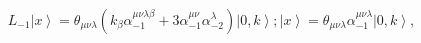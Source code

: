 \begin{equation}
L_{-1}\left\vert x\right\rangle =\theta _{\mu \nu \lambda }(k_{\beta }\alpha
_{-1}^{\mu \nu \lambda \beta }+3\alpha _{-1}^{\mu \nu }\alpha _{-2}^{\lambda
})\left\vert 0,k\right\rangle ;\left\vert x\right\rangle =\theta _{\mu \nu
\lambda }\alpha _{-1}^{\mu \nu \lambda }\left\vert 0,k\right\rangle , 
\tag{17}
\end{equation}

